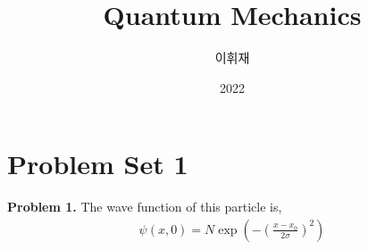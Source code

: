 \documentclass[aps,floatfix,nofootinbib,superscriptaddress,fleqn]{revtex4}
\begin{document}
\title{\Large Quantum Mechanics}
\author{이휘재}
\date{2022}

\maketitle

\section*{\large Problem Set 1}
\noindent \textbf{Problem 1.}
The wave function of this particle is,
\begin{align}
          \psi(x,0)=N \exp\left(-{\left(\frac{x-x_0}{2\sigma}\right)}^2\right)
\end{align}
\end{document}
